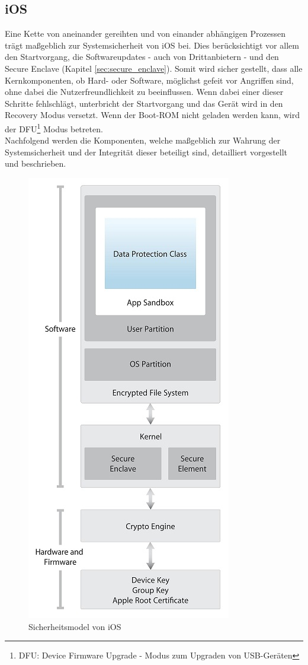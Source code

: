 \subsection{iOS}\label{sec:components-syssec} 
	Eine Kette von aneinander gereihten und von einander abhängigen Prozessen trägt
	maßgeblich zur Systemsicherheit von iOS bei. Dies berücksichtigt vor allem den
	Startvorgang, die Softwareupdates - auch von Drittanbietern - und den Secure
	Enclave (Kapitel \ref{sec:secure_enclave}). Somit wird sicher gestellt, dass
	alle Kernkomponenten, ob Hard- oder Software, möglichst gefeit vor Angriffen sind,
	ohne dabei die Nutzerfreundlichkeit zu beeinflussen. Wenn dabei einer dieser
	Schritte fehlschlägt, unterbricht der Startvorgang und das Gerät wird in den
	Recovery Modus versetzt. Wenn der Boot-ROM nicht geladen werden kann, wird der
	DFU\footnote{DFU: Device Firmware Upgrade - Modus zum Upgraden von USB-Geräten}
	Modus betreten.\\
	Nachfolgend werden die Komponenten, welche maßgeblich zur Wahrung der
	Systemsicherheit und der Integrität dieser beteiligt sind, detailliert
	vorgestellt und beschrieben.
	
	\begin{figure}[h]
		\centering
		\includegraphics[width=0.4\linewidth]{ios/media/security-model.jpg}
		\caption{Sicherheitsmodel von iOS 
		\cite[S. 4]{iOSSecurityApr2015}}
		\label{fig:security-model}
	\end{figure}

